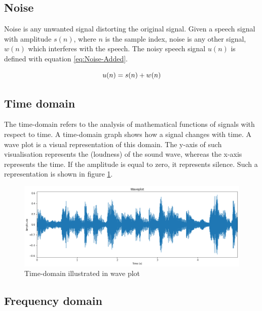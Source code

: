 \subsection{Noise}
\label{sub:Noise}

Noise is any unwanted signal distorting the original signal. Given a speech signal with amplitude $s(n)$, where $n$ is the sample index, noise is any other signal, $w(n)$ which interferes with the speech. The noisy speech signal $u(n)$ is defined with equation \ref{eq:Noise-Added}.

\begin{equation}
    \centering
    u(n) = s(n) + w(n)
    \label{eq:Noise-Added}
\end{equation}

\subsection{Time domain}
\label{sub:Time-Domain}

The time-domain refers to the analysis of mathematical functions of signals with respect to time. A time-domain graph shows how a signal changes with time. 
\newline
\newline
A wave plot is a visual representation of this domain. The y-axis of such visualisation represents the  (loudness) of the sound wave, whereas the x-axis represents the time. If the amplitude is equal to zero, it represents silence. Such a representation is shown in figure \ref{fig:Waveplot-Time-Domain}.
\begin{figure}[htbp]
	\centering
	\includegraphics[scale=0.45]{baa-documentation/img/Waveplot_Visualisation.png}
	\caption[Time-domain illustrated in wave plot]{Time-domain illustrated in wave plot}
	\label{fig:Waveplot-Time-Domain}
\end{figure}

\subsection{Frequency domain}
\label{sub:Frequency-Domain}


